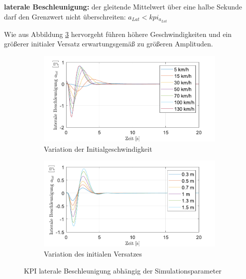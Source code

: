 \medskip\noindent\textbf{laterale Beschleunigung:} der gleitende Mittelwert über eine halbe Sekunde darf den Grenzwert nicht überschreiten: $a_{Lat} < kpi_{a_{Lat}}$

\noindent Wie aus Abbildung \ref{fig:Straight_Offset_a-Lat} hervorgeht führen höhere Geschwindigkeiten und ein größerer initialer Versatz erwartungsgemäß zu größeren Amplituden.
\begin{figure}[ht]
    \centering
    \begin{subfigure}[b]{.49\textwidth}
        \centering
        \includegraphics[width=\textwidth]{figures/3_Implementierung/Straight_Offset/varVelo_1mOffset_a-Lat.pdf}
        \caption{Variation der Initialgeschwindigkeit}
        \label{fig:varVelo_1mOffset_a-Lat}
    \end{subfigure}
    \hfill
    \begin{subfigure}[b]{.49\textwidth}
        \centering
        \includegraphics[width=\textwidth]{figures/3_Implementierung/Straight_Offset/varOffset_50kmh_a-Lat.pdf}
        \caption{Variation des initialen Versatzes}
        \label{fig:varOffset_50kmh_a-Lat}
    \end{subfigure}
    \caption{KPI laterale Beschleunigung abhängig der Simulationsparameter}
    \label{fig:Straight_Offset_a-Lat}
\end{figure}

